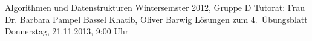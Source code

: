 \documentclass[10pt,a4paper]{article}             %
\begin{document}
\thispagestyle{ErsteSeite}						  %
\uebkopfzeile
  {Algorithmen und Datenstrukturen}               %
  {Wintersemster 2012, Gruppe D}				  %
  {Tutorat: Frau Dr. Barbara Pampel}                      			  %
  {Bassel Khatib, Oliver Barwig}					  %
\uebtitel
  {Lösungen zum 4.\ Übungsblatt}  			      %
  {Donnerstag, 21.11.2013, 9:00 Uhr }    		                      %
  
  \vspace{8mm}								 	  %



	



\newpage


\end{document}
